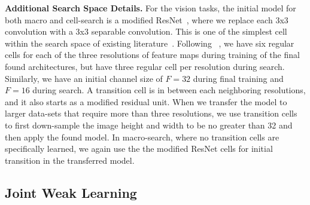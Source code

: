 \textbf{Additional Search Space Details.}
For the vision tasks, the initial model for both macro and cell-search is a modified ResNet~\citep{resnet}, where we replace each 3x3 convolution with a 3x3 separable convolution. This is one of the simplest cell within the search space of existing literature~\citep{NASCell,Pham2018EfficientNA,Liu2018DARTSDA}.  Following ~\citep{NASCell}, we have six regular cells for each of the three resolutions of feature maps during training of the final found architectures, 
but have three regular cell per resolution during search. Similarly, we have an initial channel size of $F=32$ during final training and $F=16$ during search. 
A transition cell is in between each neighboring resolutions, and it also starts as a modified residual unit. 
When we transfer the model to larger data-sets that require more than three resolutions, we use transition cells to first down-sample the image height and width to be no greater than 32 and then apply the found model. In macro-search, where no transition cells are specifically learned, we again use the the modified ResNet cells for initial transition in the transferred model.


\subsection{Joint Weak Learning}
\label{sec:candidate_init_and_select}

